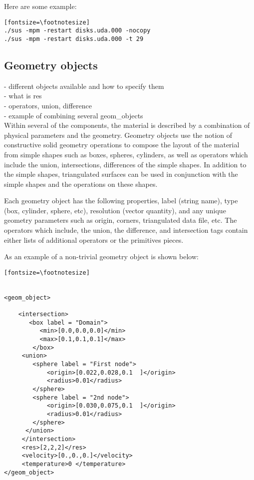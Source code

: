 Here are some example:

\begin{verbatim}[fontsize=\footnotesize]
./sus -mpm -restart disks.uda.000 -nocopy
./sus -mpm -restart disks.uda.000 -t 29
\end{verbatim}
%
\subsection{Geometry objects} \label{Sec:GeometryObjects}
- different objects available and how to specify them\\
- what is res \\
- operators, union, difference\\
- example of combining several geom\_objects\\

Within several of the components, the material is described by a
combination of physical parameters and the geometry.  Geometry objects
use the notion of constructive solid geometry operations to compose
the layout of the material from simple shapes such as boxes, spheres,
cylinders, as well as operators which include the union,
intersections, differences of the simple shapes.  In addition to the
simple shapes, triangulated surfaces can be used in conjunction with
the simple shapes and the operations on these shapes.

Each geometry object has the following properties, label (string
name), type (box, cylinder, sphere, etc), resolution (vector
quantity), and any unique geometry parameters such as origin, corners,
triangulated data file, etc.  The operators which include, the union,
the difference, and intersection tags contain either lists of
additional operators or the primitives pieces.
 

As an example of a non-trivial geometry object is shown below:

\begin{verbatim}[fontsize=\footnotesize]


<geom_object>

    <intersection>
       <box label = "Domain">
          <min>[0.0,0.0,0.0]</min>
          <max>[0.1,0.1,0.1]</max>
        </box>
     <union>
        <sphere label = "First node">
            <origin>[0.022,0.028,0.1  ]</origin>
            <radius>0.01</radius>
        </sphere>
        <sphere label = "2nd node">
            <origin>[0.030,0.075,0.1  ]</origin>
            <radius>0.01</radius>
        </sphere>
      </union>
     </intersection>
     <res>[2,2,2]</res>
     <velocity>[0.,0.,0.]</velocity>
     <temperature>0 </temperature>
</geom_object>

\end{verbatim}

